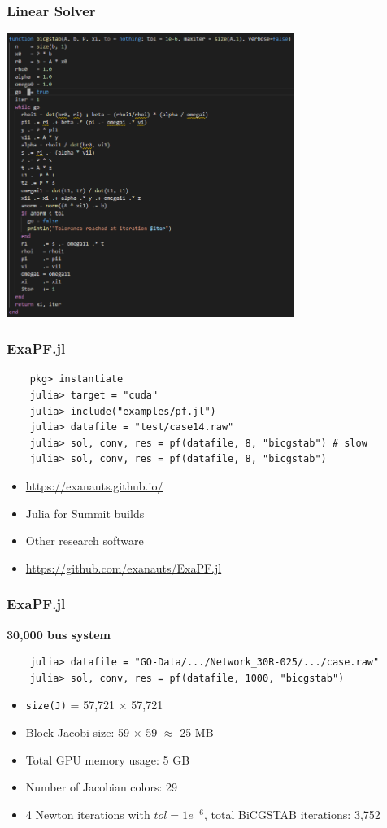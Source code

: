 \begin{frame}[fragile]
  \frametitle{Linear Solver}
  \begin{center}
   \includegraphics[width=0.7\textwidth]{figures/bicgstab.png}
  \end{center}
\end{frame}

\begin{frame}[fragile]
  \frametitle{ExaPF.jl}
  \begin{lstlisting}
    pkg> instantiate
    julia> target = "cuda" 
    julia> include("examples/pf.jl") 
    julia> datafile = "test/case14.raw"
    julia> sol, conv, res = pf(datafile, 8, "bicgstab") # slow
    julia> sol, conv, res = pf(datafile, 8, "bicgstab")
  \end{lstlisting}
  \begin{itemize}
    \item \url{https://exanauts.github.io/}
    \item Julia for Summit builds
    \item Other research software
    \item \url{https://github.com/exanauts/ExaPF.jl}
  \end{itemize}
\end{frame}

\begin{frame}[fragile]
  \frametitle{ExaPF.jl}
  {\bf 30,000 bus system}
  \begin{lstlisting}
    julia> datafile = "GO-Data/.../Network_30R-025/.../case.raw"
    julia> sol, conv, res = pf(datafile, 1000, "bicgstab")
  \end{lstlisting}
  \begin{itemize}
    \item \lstinline{size(J)} = 57,721 $\times$ 57,721 
    \item Block Jacobi size: 59 $\times$ 59 $\approx$ 25 MB
    \item Total GPU memory usage: 5 GB
    \item Number of Jacobian colors: 29
    \item 4 Newton iterations with $tol = 1e^{-6}$, total BiCGSTAB iterations: 3,752 
  \end{itemize}
\end{frame}

